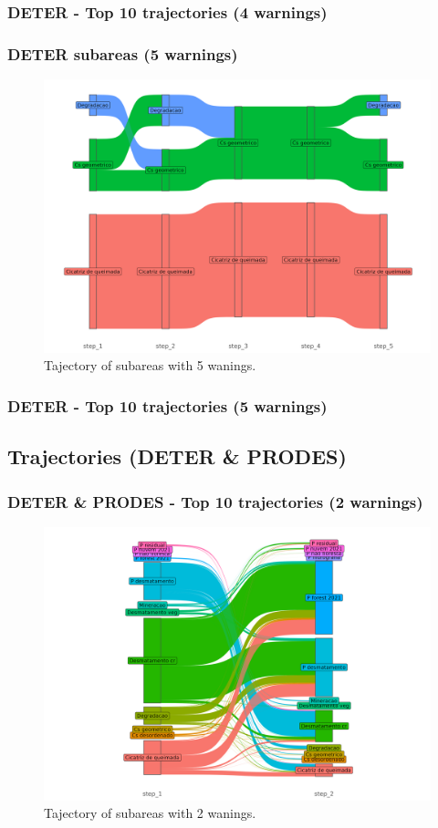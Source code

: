 \documentclass[aspectratio=169]{beamer}
\begin{document}
\begin{frame}[allowframebreaks]
    \frametitle{DETER - Top 10 trajectories (4 warnings)}
    
\end{frame}

\begin{frame}
    \frametitle{DETER subareas (5 warnings)}
    \begin{figure}[h] 
        \includegraphics[width=0.65\linewidth]
        {./figures/plot_deter_subarea_trajectory_5.png}
        \caption{Tajectory of subareas with 5 wanings.}
        \label{fig:deter_subarea_trajectory_5}
    \end{figure}
\end{frame}

\begin{frame}[allowframebreaks]
    \frametitle{DETER - Top 10 trajectories (5 warnings)}
    
\end{frame}



\subsection{Trajectories (DETER \& PRODES)} 

\begin{frame}
    \frametitle{DETER \& PRODES - Top 10 trajectories (2 warnings)}
    \begin{figure}[h] 
        \includegraphics[width=0.65\linewidth]
        {./figures/plot_deter_prodes_subarea_trajectory_2.png}
        \caption{Tajectory of subareas with 2 wanings.}
        \label{fig:deter_prodes_subarea_trajectory_2}
    \end{figure}
\end{frame}
\end{document}
